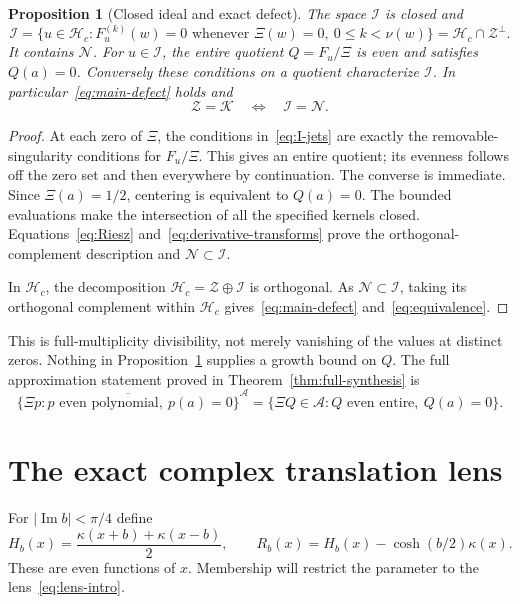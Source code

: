 \documentclass[11pt,a4paper]{article}
\numberwithin{equation}{section}
\newtheorem{proposition}[theorem]{Proposition}
\theoremstyle{definition}
\theoremstyle{remark}
\newcommand{\Hh}{\mathcal H}
\newcommand{\Nn}{\mathcal N}
\newcommand{\Ii}{\mathcal I}
\newcommand{\Zz}{\mathcal Z}
\newcommand{\Kk}{\mathcal K}
\newcommand{\Aa}{\mathcal A}
\begin{document}
\begin{proposition}[Closed ideal and exact defect]\label{prop:ideal}
The space $\Ii$ is closed and
\begin{equation}\label{eq:I-jets}
 \Ii=\{u\in\Hh_c:F_u^{(k)}(w)=0\text{ whenever }\Xi(w)=0,\ 0\le k<\nu(w)\}
 =\Hh_c\cap\Zz^\perp.
\end{equation}
It contains $\Nn$. For $u\in\Ii$, the entire quotient $Q=F_u/\Xi$ is even and satisfies $Q(a)=0$. Conversely these conditions on a quotient characterize $\Ii$. In particular~\eqref{eq:main-defect} holds and
\begin{equation}\label{eq:equivalence}
 \Zz=\Kk\quad\Longleftrightarrow\quad\Ii=\Nn.
\end{equation}
\end{proposition}
\begin{proof}
At each zero of $\Xi$, the conditions in~\eqref{eq:I-jets} are exactly the removable-singularity conditions for $F_u/\Xi$. This gives an entire quotient; its evenness follows off the zero set and then everywhere by continuation. The converse is immediate. Since $\Xi(a)=1/2$, centering is equivalent to $Q(a)=0$. The bounded evaluations make the intersection of all the specified kernels closed. Equations~\eqref{eq:Riesz} and~\eqref{eq:derivative-transforms} prove the orthogonal-complement description and $\Nn\subset\Ii$.

In $\Hh_c$, the decomposition $\Hh_c=\Zz\oplus\Ii$ is orthogonal. As $\Nn\subset\Ii$, taking its orthogonal complement within $\Hh_c$ gives~\eqref{eq:main-defect} and~\eqref{eq:equivalence}.
\end{proof}

This is full-multiplicity divisibility, not merely vanishing of the values at distinct zeros. Nothing in Proposition~\ref{prop:ideal} supplies a growth bound on $Q$. The full approximation statement proved in Theorem~\ref{thm:full-synthesis} is
\begin{equation}\label{eq:ideal-synthesis}
 \overline{\{\Xi p:p\text{ even polynomial},\ p(a)=0\}}^{\Aa}
 =\{\Xi Q\in\Aa:Q\text{ even entire},\ Q(a)=0\}.
\end{equation}

\section{The exact complex translation lens}\label{sec:translations}

For $|\operatorname{Im}b|<\pi/4$ define
\begin{equation}\label{eq:H-R}
 H_b(x)=\frac{\kappa(x+b)+\kappa(x-b)}2,\qquad
 R_b(x)=H_b(x)-\cosh(b/2)\kappa(x).
\end{equation}
These are even functions of $x$. Membership will restrict the parameter to the lens~\eqref{eq:lens-intro}.
\end{document}
